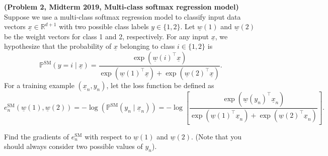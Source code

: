 \documentclass{article}
\newcommand{\probP}{\mathds{P}}
\theoremstyle{definition}
\newtheorem*{answer}{Answer}
\begin{document}
\begin{question}[start=0]
	\item \textbf{(Problem 2, Midterm 2019, Multi-class softmax regression model)}
	Suppose we use a multi-class softmax regression model to classify input data vectors $\underline{x} \in \mathbb{R}^{d+1}$ with two possible class labels $y \in \{1, 2\}$. Let $\underline{w}(1)$ and $\underline{w}(2)$ be the weight vectors for class 1 and 2, respectively. For any input $\underline{x}$, we hypothesize that the probability of $\underline{x}$ belonging to class $i \in \{1, 2\}$ is
	\[
	\probP^{\text{SM}}(y = i\mid \underline{x}) = \frac{\exp(\underline{w}(i)^\top \underline{x})}{\exp(\underline{w}(1)^\top \underline{x}) + \exp(\underline{w}(2)^\top \underline{x})}.
	\]
	For a training example $(\underline{x}_n, y_n)$, let the loss function be defined as
	\[
	e^{\text{SM}}_{n}(\underline{w}(1), \underline{w}(2)) = -\log(\probP^{\text{SM}}(y_n\mid \underline{x}_n)) = -\log\left[\frac{\exp(\underline{w}(y_n)^\top \underline{x}_n)}{\exp(\underline{w}(1)^\top\underline{x}_n) + \exp(\underline{w}(2)^\top\underline{x}_n)}\right].
	\]
	\begin{question}
		\item Find the gradients of $e^{\text{SM}}_{n}$ with respect to $\underline{w}(1)$ and $\underline{w}(2)$. (Note that you should always consider two possible values of $y_n$).
		

\end{question}
\end{question}
\end{document}
